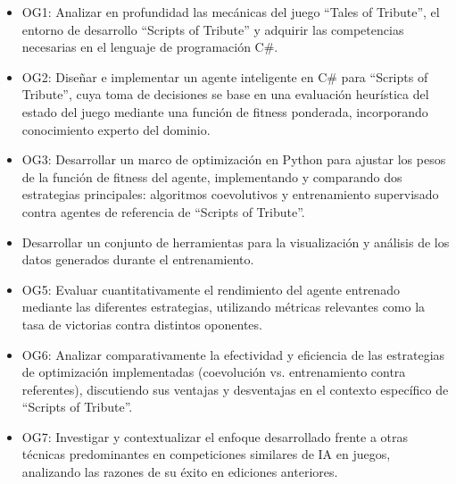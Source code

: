 \begin{itemize}
	\item OG1: Analizar en profundidad las mecánicas del juego ``Tales of Tribute'', el entorno de desarrollo ``Scripts of Tribute'' y adquirir las competencias necesarias en el lenguaje de programación C\#.
	\item OG2: Diseñar e implementar un agente inteligente en C\# para ``Scripts of Tribute'', cuya toma de decisiones se base en una evaluación heurística del estado del juego mediante una función de fitness ponderada, incorporando conocimiento experto del dominio.
	\item OG3: Desarrollar un marco de optimización en Python para ajustar los pesos de la función de fitness del agente, implementando y comparando dos estrategias principales: algoritmos coevolutivos y entrenamiento supervisado contra agentes de referencia de ``Scripts of Tribute''.
	\item Desarrollar un conjunto de herramientas para la visualización y análisis de los datos generados durante el entrenamiento.
	\item OG5: Evaluar cuantitativamente el rendimiento del agente entrenado mediante las diferentes estrategias, utilizando métricas relevantes como la tasa de victorias contra distintos oponentes.
	\item OG6: Analizar comparativamente la efectividad y eficiencia de las estrategias de optimización implementadas (coevolución vs. entrenamiento contra referentes), discutiendo sus ventajas y desventajas en el contexto específico de ``Scripts of Tribute''.
	\item OG7: Investigar y contextualizar el enfoque desarrollado frente a otras técnicas predominantes en competiciones similares de IA en juegos, analizando las razones de su éxito en ediciones anteriores.
\end{itemize}